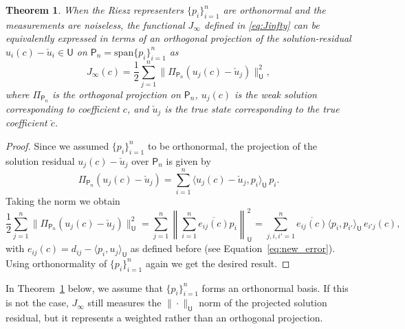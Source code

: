 \documentclass[12pt]{amsart}
\newtheorem{thm}{Theorem}
\begin{document}
\begin{thm}\label{thm:sol_proj}
When the Riesz representers $\{p_i\}_{i=1}^n$ are orthonormal and the measurements are noiseless, the functional $J_\infty$ defined in \eqref{eq:Jinfty} can be equivalently expressed in terms of an orthogonal projection of the solution-residual $u_i(c) - \check{u}_i \in \mathsf{U}$ on $\mathsf{P}_n = \text{span}\{p_i\}_{i=1}^n$ as
\[
J_{\infty}(c) = {\textstyle\frac{1}{2}}\sum_{j=1}^n\|\Pi_{\mathsf{P}_n}(u_j(c) - \check{u}_j)\|_{\mathsf{U}}^2,
\]
where $\Pi_{\mathsf{P}_n}$ is the orthogonal projection on $\mathsf{P}_n$, $u_j(c)$ is the weak solution corresponding to coefficient $c$, and $\check{u}_j$ is the true state corresponding to the true coefficient $\check{c}$.
\end{thm}
\begin{proof}
Since we assumed $\{p_i\}_{i=1}^n$ to be orthonormal, the projection of the solution residual $u_j(c) - \check{u}_j$ over $\mathsf{P}_n $ is given by 
\[
\Pi_{\mathsf{P}_n}(u_j(c) - \check{u}_j) = \sum_{i=1}^n \langle u_j(c) - \check{u}_j,p_i\rangle_{\mathsf{U}}\,p_i.
\]
Taking the norm we obtain
\[
{\textstyle\frac{1}{2}}\sum_{j=1}^n\|\Pi_{\mathsf{P}_n}(u_j(c) - \check{u}_j)\|_{\mathsf{U}}^2 = \sum_{j=1}^n \left\|\sum_{i=1}^n \overline{e_{ij}(c)}p_i\right\|_{\mathsf{U}}^2 = \sum_{j,i,i'=1}^n \overline{e_{ij}(c)}\langle p_i,p_{i'}\rangle_\mathsf{U}\, {e_{i'j}(c)},
\]
with $e_{ij}(c) = d_{ij} - \langle p_i, u_j\rangle_{\mathsf{U}}$ as defined before (see Equation~\eqref{eq:new_error}).
Using orthonormality of $\{p_i\}_{i=1}^n$ again we get the desired result.
\end{proof}
{In Theorem~\ref{thm:sol_proj} below, we assume that $\{p_i\}_{i=1}^n$ forms an orthonormal basis. If this is not the case, $J_\infty$ still measures the $\|\cdot\|_{\mathsf{U}}$ norm of the projected solution residual, but it represents a weighted rather than an orthogonal projection.}
\end{document}

